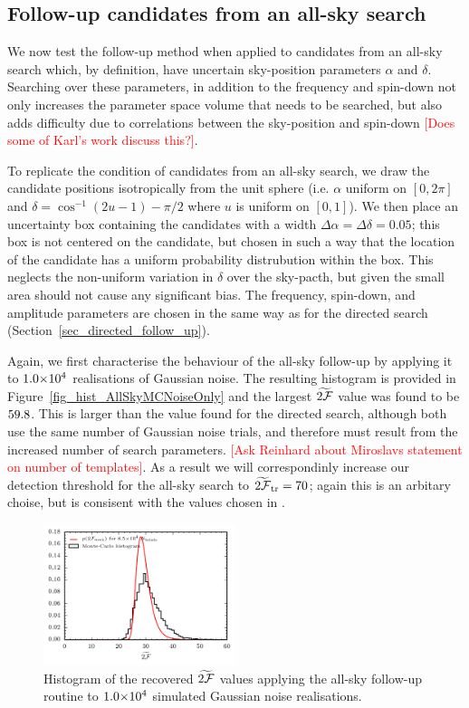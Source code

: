 \documentclass[aps, prd, twocolumn, superscriptaddress, floatfix, showpacs, nofootinbib, longbibliography]{revtex4-1}
\newcommand{\comment}[1]{\textcolor{red}{[#1]}}
\begin{document}
\subsection{Follow-up candidates from an all-sky search}
\label{sec_all_sky_follow_up}

We now test the follow-up method when applied to candidates from an all-sky
search which, by definition, have uncertain sky-position parameters $\alpha$
and $\delta$. Searching over these parameters, in addition to the frequency
and spin-down not only increases the parameter space volume that needs to be
searched, but also adds difficulty due to correlations between the sky-position
and spin-down \comment{Does some of Karl's work discuss this?}.

To replicate the condition of candidates from an all-sky search, we draw the
candidate positions isotropically from the unit sphere (i.e. $\alpha$ uniform
on $[0, 2\pi]$ and $\delta = \cos^{-1}(2u{-}1){- }\pi/2$ where $u$ is uniform
on $[0, 1]$). We then place an uncertainty box containing the candidates with a
width $\Delta\alpha=\Delta\delta=0.05$; this box is not centered on the
candidate, but chosen in such a way that the location of the candidate has a
uniform probability distrubution within the box. This neglects the non-uniform
variation in $\delta$ over the sky-pacth, but given the small area should not
cause any significant bias. The frequency, spin-down, and amplitude parameters
are chosen in the same way as for the directed search
(Section~\ref{sec_directed_follow_up}). 

Again, we first characterise the behaviour of the all-sky follow-up by applying
it to $1.0{\times}10^{4}$ realisations of Gaussian noise. The resulting histogram
is provided in Figure~\ref{fig_hist_AllSkyMCNoiseOnly} and the largest $\widetilde{2{\mathcal{F}}}$
value was found to be $59.8$. This is larger than the
value found for the directed search, although both use the same number of
Gaussian noise trials, and therefore must result from the increased number of
search parameters. \comment{Ask Reinhard about Miroslavs statement on number of
templates}. As a result we will correspondinly increase our detection threshold
for the all-sky search to $\widetilde{2{\mathcal{F}}}_{\rm tr} = 70$; again this is an arbitary
choise, but is consisent with the values chosen in \citet{shaltev2013}.
\begin{figure}[htb]
\centering
\includegraphics[width=0.5\textwidth]{allsky_noise_twoF_histogram}
\caption{Histogram of the recovered $\widetilde{2{\mathcal{F}}}$ values applying the
all-sky follow-up routine to $1.0{\times}10^{4}$ simulated Gaussian noise
realisations.}
\label{fig:}
\end{figure}
\end{document}
